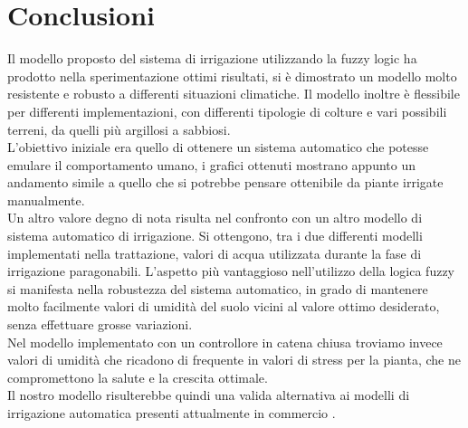 \documentclass[conference,10pt]{IEEEtran}
\begin{document}
\section{Conclusioni}\label{sec:conclusion}
Il modello proposto del sistema di irrigazione utilizzando la fuzzy logic ha prodotto nella sperimentazione ottimi risultati, si è dimostrato un modello molto resistente e robusto a differenti situazioni climatiche. Il modello inoltre è flessibile per differenti implementazioni, con differenti tipologie di colture e vari possibili terreni, da quelli più argillosi a sabbiosi.\\
L'obiettivo iniziale era quello di ottenere un sistema automatico che potesse emulare il comportamento umano, i grafici ottenuti mostrano appunto un andamento simile a quello che si potrebbe pensare ottenibile da piante irrigate manualmente.\\
 Un altro valore degno di nota risulta nel confronto con un altro modello di sistema automatico di irrigazione. Si ottengono, tra i due differenti modelli implementati nella trattazione, valori di acqua utilizzata durante la fase di irrigazione paragonabili. L'aspetto più vantaggioso nell'utilizzo della logica fuzzy si manifesta nella robustezza del sistema automatico, in grado di mantenere molto facilmente valori di umidità del suolo vicini al valore ottimo desiderato, senza effettuare grosse variazioni.\\
 Nel modello implementato con un controllore in catena chiusa troviamo invece valori di umidità che ricadono di frequente in valori di stress per la pianta, che ne compromettono la salute e la crescita ottimale.\\
Il nostro modello risulterebbe quindi una valida alternativa ai modelli di irrigazione automatica presenti attualmente in commercio .




%

\end{document}
